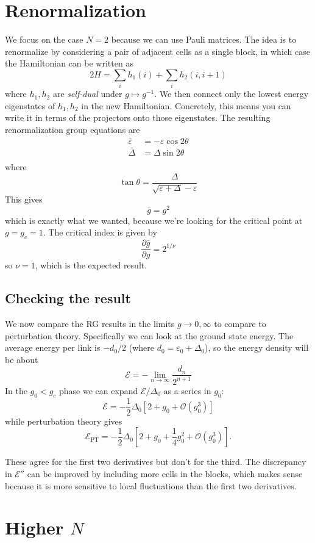 \documentclass[10pt]{article}
\theoremstyle{definition}
\begin{document}
\section{Renormalization}
We focus on the case $N=2$ because we can use Pauli matrices.
The idea is to renormalize by considering a pair of adjacent cells as a single block, in which case the Hamiltonian can be written as
\[
2H = \sum_i h_1(i) + \sum_i h_2(i,i+1)
\]
where $h_1, h_2$ are \emph{self-dual} under $g \mapsto g^{-1}$.
We then connect only the lowest energy eigenstates of $h_1, h_2$ in the new Hamiltonian.
Concretely, this means you can write it in terms of the projectors onto those eigenstates.
The resulting renormalization group equations are
\begin{align*}
\bar \varepsilon &= - \varepsilon \cos 2 \theta\\
\bar \Delta &= \Delta \sin 2 \theta\\
\end{align*}
where
\[
\tan \theta = \frac{\Delta}{\sqrt{\varepsilon + \Delta}-\varepsilon}
\]
This gives
\[
\bar g = g^2
\]
which is exactly what we wanted, because we're looking for the critical point at $g = g_c = 1$.
The critical index is given by
\[
\frac{\partial \bar g }{\partial g} = 2^{1/\nu}
\]
so $\nu = 1$, which is the expected result.

\subsection{Checking the result}
We now compare the RG results in the limits $g \to 0, \infty$ to compare to perturbation theory.
Specifically we can look at the ground state energy.
The average energy per link is $-d_0/2$ (where $d_0 = \varepsilon_0 + \Delta_0$), so the energy density will be about
\[
\mathcal E = - \lim_{n \to \infty} \frac{d_n}{2^{n+1}}
\]
In the $g_0 < g_c$ phase we can expand $\mathcal E/\Delta_0$ as a series in $g_0$:
\[
\mathcal E = - \frac{1}{2} \Delta_0 \left[ 2 + g_0 + \mathcal O(g^3_0) \right]
\]
while perturbation theory gives
\[
\mathcal{E}_{\mathrm{PT}} = -\frac{1}{2} \Delta_0 \left [ 2 + g_0 + \frac{1}{4} g_0^2 + \mathcal O(g^3_0) \right].
\]

These agree for the first two derivatives but don't for the third.
The discrepancy in $\mathcal E''$ can be improved by including more cells in the blocks, which makes sense because it is more sensitive to local fluctuations than the first two derivatives.
\section{Higher $N$}
\end{document}
